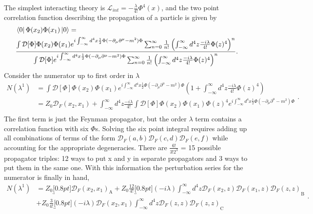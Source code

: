 The simplest interacting theory is $\mathcal{L}_{int} = -\frac{\lambda}{4!}\Phi^4(x)$, and the two point correlation function describing the propagation of a particle is given by
%
\begin{equation}
\begin{split}
&\bra{0}\Phi(x_2)\Phi(x_1)\ket{0} = \\ 
& \frac{\int \mathcal{D}[\Phi]\Phi(x_2)\Phi(x_1)
e^{i\int_{-\infty}^{\infty} d^4x \frac{1}{2}\Phi (-\partial_\mu\partial^\mu - m^2)\Phi} \sum_{n=0}^{\infty} \frac{1}{n!}\left(\int_{-\infty}^{\infty} d^4z \frac{-i\lambda}{4!}\Phi(z)^4\right)^n}
{\int \mathcal{D}[\Phi]e^{i\int_{-\infty}^{\infty} d^4x \frac{1}{2}\Phi (-\partial_\mu\partial^\mu - m^2)\Phi} \sum_{n=0}^{\infty} \frac{1}{n!}\left(\int_{-\infty}^{\infty} d^4z \frac{-i\lambda}{4!}\Phi(z)^4 \right)^n }. \\
\end{split}
\end{equation}
%
Consider the numerator up to first order in $\lambda$
%
\begin{equation}
\begin{split}
N(\lambda^1) &= \int \mathcal{D}[\Phi]\Phi(x_2)\Phi(x_1)
e^{i\int_{-\infty}^{\infty} d^4x \frac{1}{2}\Phi (-\partial_\mu\partial^\mu - m^2)\Phi} \left(1 + \int_{-\infty}^{\infty} d^4z \frac{-i\lambda}{4!}\Phi(z)^4\right) \\
&=  Z_0\mathcal{D}_F(x_2,x_1) +  
\int_{-\infty}^{\infty} d^4z \frac{-i\lambda}{4!} \int \mathcal{D}[\Phi]\Phi(x_2)\Phi(x_1)\Phi(z)^4e^{i\int_{-\infty}^{\infty} d^4x \frac{1}{2}\Phi (-\partial_\mu\partial^\mu - m^2)\Phi}\\
\end{split}.
\end{equation}
%
The first term is just the Feynman propagator, but the order $\lambda$ term contains a correlation function with six $\Phi$s. Solving the six point integral requires adding up all combinations of terms of the form $\mathcal{D}_F(a,b) \mathcal{D}_F(c,d) \mathcal{D}_F(e,f)$ while accounting for the appropriate degeneracies. There are $\frac{6!}{3!2^3}$ = 15 possible propagator triples: 12 ways to put x and y in separate propagators and 3 ways to put them in the same one. With this information the perturbation series for the numerator is finally in hand, 
\begin{equation}
\begin{split}
N(\lambda^1) &= Z_0\underbracket[0.8pt]{\mathcal{D}_F(x_2,x_1)}_\text{A} 
+ Z_0\frac{12}{4!} \underbracket[0.8pt]{(-i\lambda)\int_{-\infty}^{\infty} d^4z \mathcal{D}_F(x_2,z) \mathcal{D}_F(x_1,z) \mathcal{D}_F(z,z)}_\text{B} \\ 
&+ Z_0\frac{3}{4!}\underbracket[0.8pt]{(-i\lambda)\mathcal{D}_F(x_2,x_1) \int_{-\infty}^{\infty} d^4z \mathcal{D}_F(z,z) \mathcal{D}_F(z,z)}_\text{C} 
\end{split}.
\end{equation} 

